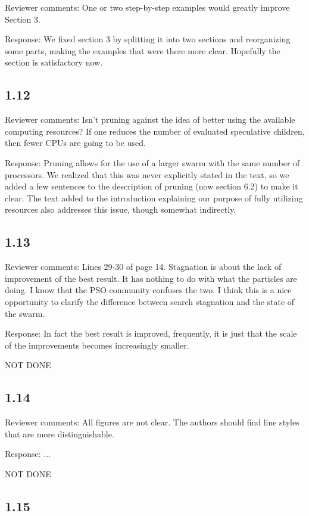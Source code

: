 \documentclass[onecolumn, 12pt]{article}
\begin{document}
Reviewer comments: One or two step-by-step examples would greatly improve
Section 3.

Response: We fixed section 3 by splitting it into two sections and reorganizing
some parts, making the examples that were there more clear.  Hopefully the
section is satisfactory now.

\subsection*{1.12}

Reviewer comments: Isn't pruning against the idea of better using the available
computing resources? If one reduces the number of evaluated speculative
children, then fewer CPUs are going to be used.

Response: Pruning allows for the use of a larger swarm with the same number of
processors.  We realized that this was never explicitly stated in the text, so
we added a few sentences to the description of pruning (now section 6.2) to
make it clear.  The text added to the introduction explaining our purpose of
fully utilizing resources also addresses this issue, though somewhat
indirectly.

\subsection*{1.13}

Reviewer comments: Lines 29-30 of page 14. Stagnation is about the lack of
improvement of the best result. It has nothing to do with what the particles
are doing. I know that the PSO community confuses the two. I think this is a
nice opportunity to clarify the difference between search stagnation and the
state of the swarm.

Response: In fact the best result is improved, frequently, it is just that the
scale of the improvements becomes increasingly smaller.

NOT DONE

\subsection*{1.14}

Reviewer comments: All figures are not clear. The authors should find line
styles that are more distinguishable.

Response: ...

NOT DONE

\subsection*{1.15}
\end{document}
